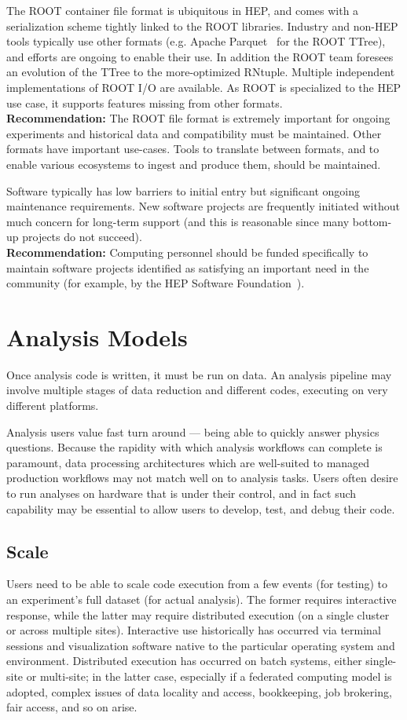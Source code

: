 The ROOT container file format is ubiquitous in HEP, and comes with a serialization scheme tightly linked to the ROOT libraries. Industry and non-HEP tools typically use other formats (e.g. Apache Parquet~\cite{Parquet} for the ROOT TTree), and efforts are ongoing to enable their use. In addition the ROOT team foresees an evolution of the TTree to the more-optimized RNtuple. Multiple independent implementations of ROOT I/O are available. As ROOT is specialized to the HEP use case, it supports features missing from other formats.\\
\textbf{Recommendation:} The ROOT file format is extremely important for ongoing experiments and historical data and compatibility must be maintained. Other formats have important use-cases. Tools to translate between formats, and to enable various ecosystems to ingest and produce them, should be maintained.

Software typically has low barriers to initial entry but significant ongoing maintenance requirements. New software projects are frequently initiated without much concern for long-term support (and this is reasonable since many bottom-up projects do not succeed).\\
\textbf{Recommendation:} Computing personnel should be funded specifically to maintain software projects identified as satisfying an important need in the community (for example, by the HEP Software Foundation~\cite{HSF}). 


\section{Analysis Models}
Once analysis code is written, it must be run on data. An analysis pipeline may involve multiple stages of data reduction and different codes, executing on very different platforms.

Analysis users value fast turn around --- being able to quickly answer physics questions. Because the rapidity with which analysis workflows can complete is paramount, data processing architectures which are well-suited to managed production workflows may not match well on to analysis tasks. Users often desire to run analyses on hardware that is under their control, and in fact such capability may be essential to allow users to develop, test, and debug their code. 

\subsection{Scale}
Users need to be able to scale code execution from a few events (for testing) to an experiment's full dataset (for actual analysis). The former requires interactive response, while the latter may require distributed execution (on a single cluster or across multiple sites). Interactive use historically has occurred via terminal sessions and visualization software native to the particular operating system and environment. Distributed execution has occurred on batch systems, either single-site or multi-site; in the latter case, especially if a federated computing model is adopted, complex issues of data locality and access, bookkeeping, job brokering, fair access, and so on arise.

